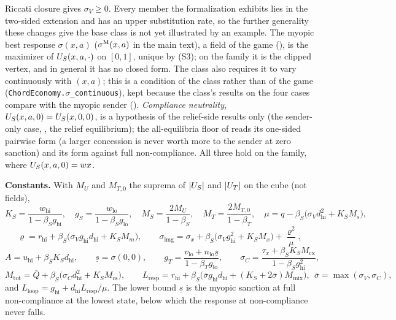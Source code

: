 Riccati closure gives $\sigma_V\ge0$. Every member the formalization exhibits
lies in the two-sided extension and has an upper substitution rate, so the
further generality these changes give the base class is not yet illustrated
by an example.
The myopic best response $\sigma(x,a)$ ($\sigma^{\mathrm{M}}(x,a)$ in the main text), a field
of the game (), is the
maximizer of $U_S(x,a,\cdot)$ on $[0,1]$, unique by (S3); on the family it is the
clipped vertex, and in general it has no closed form. The class also requires it
to vary continuously with $(x,a)$; this is a condition of the
class rather than of the game (\texttt{ChordEconomy.$\sigma$\_continuous}), kept
because the class's results on the four cases compare with the myopic sender
(). \emph{Compliance
neutrality}, $U_S(x,a,0)=U_S(x,0,0)$, is a hypothesis of the relief-side results
only (the sender-only case, , the relief equilibrium);
the all-equilibria floor of  reads its one-sided
pairwise form (a larger concession is never worth more to the sender at zero
sanction) and  its form against full non-compliance.
All three hold on the family, where $U_S(x,a,0)=wx$.

\textbf{Constants.} With $M_U$ and $M_{T,0}$ the suprema of $|U_S|$ and $|U_T|$
on the cube (not fields),
\[
K_S=\frac{w_{\mathrm{hi}}}{1-\beta_Sg_{\mathrm{hi}}},\quad
g_S=\frac{w_{\mathrm{lo}}}{1-\beta_Sg_{\mathrm{lo}}},\quad
M_S=\frac{2M_U}{1-\beta_S},\quad
M_T=\frac{2M_{T,0}}{1-\beta_T},\quad
\mu=q-\beta_S\bigl(\sigma_Vd_{\mathrm{hi}}^2+K_SM_s\bigr),
\]
\[
\varrho=r_{\mathrm{hi}}+\beta_S\bigl(\sigma_Vg_{\mathrm{hi}}d_{\mathrm{hi}}+K_SM_m\bigr),\qquad
\sigma_{\mathrm{img}}=\sigma_x+\beta_S\bigl(\sigma_Vg_{\mathrm{hi}}^2+K_SM_x\bigr)+\frac{\varrho^2}{\mu},
\]
\[
A=u_{\mathrm{hi}}+\beta_SK_Sd_{\mathrm{hi}},\qquad
\underline s=\sigma(0,0),\qquad
g_T=\frac{v_{\mathrm{lo}}+n_{\mathrm{lo}}\underline s}{1-\beta_Tg_{\mathrm{lo}}},\qquad
\sigma_C=\frac{\tau_x+\beta_SK_SM_{\mathrm{cx}}}{1-\beta_Sg_{\mathrm{hi}}^2},
\]
\[
M_{\mathrm{tot}}=\bar Q+\beta_S\bigl(\sigma_Cd_{\mathrm{hi}}^2+K_SM_{\mathrm{cs}}\bigr),\qquad
L_{\mathrm{resp}}=r_{\mathrm{hi}}+\beta_S\bigl(\bar\sigma g_{\mathrm{hi}}d_{\mathrm{hi}}
+(K_S+2\bar\sigma)M_{\mathrm{mix}}\bigr),\ \ \bar\sigma=\max(\sigma_V,\sigma_C),
\]
and $L_{\mathrm{loop}}=g_{\mathrm{hi}}+d_{\mathrm{hi}}L_{\mathrm{resp}}/\mu$. The
lower bound $\underline s$ is the myopic sanction at full non-compliance at the lowest state,
below which the response at non-compliance never falls.

